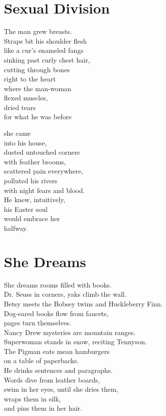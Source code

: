 \documentclass[twoside,10pt]{book}
\begin{document}
\clearpage
\section{Sexual Division}

The man grew breasts.\\
Straps bit his shoulder flesh\\
like a cur's enameled fangs\\
sinking past curly chest hair,\\
cutting through bones\\
right to the heart\\
where the man-woman\\
flexed muscles,\\
dried tears\\
for what he was before

she came\\
into his house,\\
dusted untouched corners\\
with feather brooms,\\
scattered pain everywhere,\\
polluted his rivers\\
with night fears and blood.\\
He knew, intuitively,\\
his Easter soul\\
would embrace her\\
halfway.


\clearpage
\section{She Dreams}

She dreams rooms filled with books.\\
Dr. Seuss in corners, yaks climb the wall.\\
Betsy meets the Bobsey twins and Huckleberry Finn.\\
Dog-eared books flow from faucets,\\
pages turn themselves.\\
Nancy Drew mysteries are mountain ranges.\\
Superwoman stands in snow, reciting Tennyson.\\
The Pigman eats mean hamburgers\\
on a table of paperbacks.\\
He drinks sentences and paragraphs.\\
Words dive from leather boards,\\
swim in her eyes, until she dries them,\\
wraps them in silk,\\
and pins them in her hair.
\end{document}
